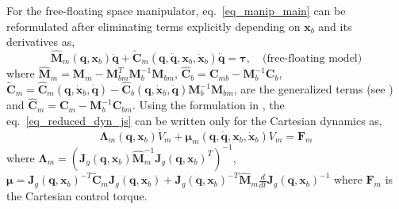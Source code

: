{For the free-floating space manipulator, eq.~\eqref{eq_manip_main} can be reformulated after eliminating terms explicitly depending on $\mathbf{x}_b$ and its derivatives as, 
\begin{equation}\label{eq_reduced_dyn_js}
 \hat{\mathbf{M}}_m(\mathbf{q},\mathbf{x}_b)\ddot{\mathbf{q}} + \tilde{\mathbf{C}}_m(\mathbf{q},\dot{\mathbf{q}},\mathbf{x}_b,\dot{\mathbf{x}}_b)\dot{\mathbf{q}} = \mathbf{\tau},  \quad \text{(free-floating model)}
\end{equation}
where $\hat{\mathbf{M}}_m = \mathbf{M}_m - \mathbf{M}_{bm}^T\mathbf{M}_b^{-1}\mathbf{M}_{bm}$, $\hat{\mathbf{C}}_b = \mathbf{C}_{mb} - \mathbf{M}_b^{-1}\mathbf{C}_b$, $\tilde{\mathbf{C}}_m= \hat{\mathbf{C}}_m(\mathbf{q},\dot{\mathbf{x}}_b,\dot{\mathbf{q}}) - \hat{\mathbf{C}}_b(\mathbf{q},\dot{\mathbf{x}}_b,\dot{\mathbf{q}})\mathbf{M}_b^{-1}\mathbf{M}_{bm}$, are the generalized terms (see \cite{Nech_Yosh_ff}) and $\hat{\mathbf{C}}_m = \mathbf{C}_m - \mathbf{M}_b^{-1}\mathbf{C}_{bm}$. Using the formulation in \cite[eq. 10]{Ott}, the eq.~\eqref{eq_reduced_dyn_js} can be written only for the Cartesian dynamics as, 
\begin{equation}
\mathbf{\Lambda}_m(\mathbf{q},\mathbf{x}_b)\dot{V}_m + \mathbf{\mu}_m(\mathbf{q},\dot{\mathbf{q}},\mathbf{x}_b,\dot{\mathbf{x}}_b)V_m = \mathcal{\mathbf{F}}_m
\end{equation}
where $\mathbf{\Lambda}_m = (\mathbf{J}_g(\mathbf{q},{\mathbf{x}}_b)\hat{\mathbf{M}}_m^{-1}\mathbf{J}_g(\mathbf{q},{\mathbf{x}}_b)^T )^{-1}$, $\mathbf{\mu} = \mathbf{J}_g(\mathbf{q},{\mathbf{x}}_b)^{-T}\tilde{\mathbf{C}}_m\mathbf{J}_g(\mathbf{q},{\mathbf{x}}_b) + \mathbf{J}_g(\mathbf{q},{\mathbf{x}}_b)^{-T}\hat{\mathbf{M}}_m\frac{d}{dt}\mathbf{J}_g(\mathbf{q},{\mathbf{x}}_b)^{-1}$ where $\mathcal{\mathbf{F}}_m$ is the Cartesian control torque.}




